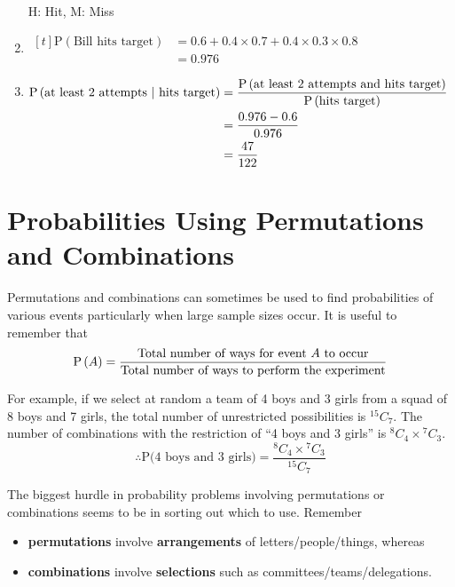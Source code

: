 \documentclass[11pt,a4paper]{book}
\begin{document}
\begin{example}
\begin{enumerate}[label=(\alph*)]
\begin{tikzpicture}[grow=right,->,>=angle 60]
\end{tikzpicture}

H: Hit, M: Miss

\item
$
\begin{aligned}[t]
\text{P}\left(\text{Bill hits target}\right) & =0.6+0.4\times0.7+0.4\times0.3\times0.8\\
 & =0.976
\end{aligned}
$

\item
$
\begin{aligned}[t]
\text{P}\left(\text{at least 2 attempts \ensuremath{\mid} hits target}\right) & =\frac{\text{P}\left(\text{at least 2 attempts and hits target}\right)}{\text{P}\left(\text{hits target}\right)}\\
 & =\frac{0.976-0.6}{0.976}\\
 & =\frac{47}{122}
\end{aligned}
$

\end{enumerate}
\end{example}

\section{Probabilities Using Permutations and Combinations}

Permutations and combinations can sometimes be used to find probabilities
of various events particularly when large sample sizes occur. It
is useful to remember that
\[
\text{P}\left(A\right)=\frac{\text{Total number of ways for event \ensuremath{A} to occur}}{\text{Total number of ways to perform the experiment}}
\]

For example, if we select at random a team of 4 boys and 3 girls from
a squad of 8 boys and 7 girls, the total number of unrestricted possibilities
is $^{15}C_{7}$. The number of combinations with the restriction
of ``4 boys and 3 girls'' is $^{8}C_{4}\times{}^{7}C_{3}$.
\[
\therefore\text{P(4 boys and 3 girls)}=\frac{^{8}C_{4}\times{}^{7}C_{3}}{^{15}C_{7}}
\]

The biggest hurdle in probability problems involving permutations
or combinations seems to be in sorting out which to use. Remember

\begin{itemize}[leftmargin=2cm]

\item \textbf{permutations} involve \textbf{arrangements} of letters/people/things,
whereas

\item \textbf{combinations} involve \textbf{selections} such as
committees/teams/delegations.

\end{itemize}
\end{document}
